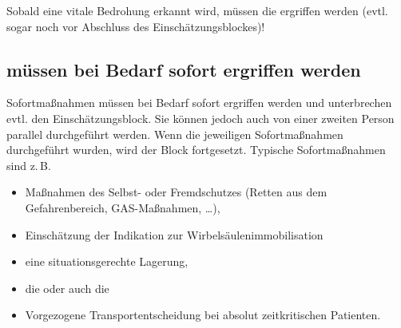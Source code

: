 \begin{Danger}
  \item Sobald eine vitale Bedrohung erkannt wird, müssen die
  \TxMassVit{}
  ergriffen werden (evtl. sogar noch vor Abschluss des
  Einschätzungsblockes)!
\end{Danger}



\subsection{ müssen bei Bedarf sofort ergriffen werden}

\Text
{{\TxBeschreibung}}%
{%
\label{topic:patientenmanagement-erstmassnahmen}%
\label{topic:patientenmanagement-sofortmassnahmen}%
Sofortmaßnahmen müssen bei Bedarf sofort ergriffen
werden und unterbrechen evtl. den Einschätzungsblock. Sie
können jedoch auch von einer zweiten Person parallel
durchgeführt werden. Wenn die jeweiligen Sofortmaßnahmen durchgeführt
wurden, wird der Block fortgesetzt. Typische Sofortmaßnahmen
sind z.\,B. 
\begin{itemize}
  \item Maßnahmen des Selbst- oder Fremdschutzes (Retten
  aus dem Gefahrenbereich, GAS-Maßnahmen, \ldots),
  \item Einschätzung der Indikation zur Wirbelsäulenimmobilisation
  \item eine situationsgerechte Lagerung,
  \item die \EE{\TxMassVit} oder auch die
  \item Vorgezogene Transportentscheidung bei absolut zeitkritischen Patienten.
\end{itemize}
}%


\clearpage %




